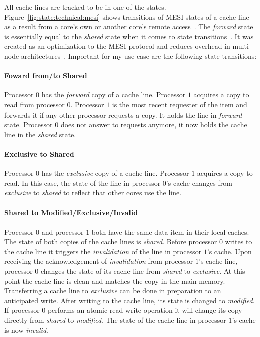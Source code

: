 All cache lines are tracked to be in one of the states.
Figure~\ref{fig:state:technical:mesi} shows transitions of MESI states of a
cache line as a result from a core's own or another core's remote
access~\cite{mckenney2010memory}. The \textit{forward} state is essentially
equal to the \textit{shared} state when it comes to state
transitions~\cite{hay2012mesif}. It was created as an optimization to the MESI
protocol and reduces overhead in multi node
architectures~\cite{goodman2004mesif}. Important for my use case are the
following state transitions:

\paragraph{Foward from/to Shared}
Processor $0$ has the \textit{forward} copy of a cache line. Processor $1$
acquires a copy to read from processor $0$. Processor $1$ is the most recent
requester of the item and forwards it if any other processor requests a copy. It
holds the line in \textit{forward} state. Processor $0$ does not answer to
requests anymore, it now holds the cache line in the \textit{shared} state.

\paragraph{Exclusive to Shared}
Processor $0$ has the \textit{exclusive} copy of a cache line. Processor $1$
acquires a copy to read. In this case, the state of the line in processor $0$'s
cache changes from \textit{exclusive} to \textit{shared} to reflect that other
cores use the line.

\paragraph{Shared to Modified/Exclusive/Invalid}
Processor $0$ and processor $1$ both have the same data item in their local
caches. The state of both copies of the cache lines is \textit{shared}. Before
processor $0$ writes to the cache line it triggers the \textit{invalidation} of
the line in processor $1$'s cache. Upon receiving the acknowledgement of
\textit{invalidation} from processor $1$'s cache line, processor $0$ changes the
state of its cache line from \textit{shared} to \textit{exclusive}. At this
point the cache line is clean and matches the copy in the main memory.
Transferring a cache line to \textit{exclusive} can be done in preparation to an
anticipated write. After writing to the cache line, its state is changed to
\textit{modified}. If processor $0$ performs an atomic read-write operation it
will change its copy directly from \textit{shared} to \textit{modified}. The
state of the cache line in processor $1$'s cache is now \textit{invalid}.

